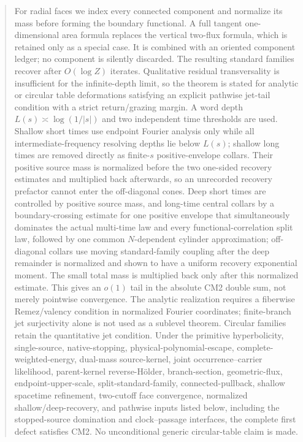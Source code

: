 \documentclass[11pt]{article}
\begin{document}
\begin{abstract}
For radial faces we index every connected component and normalize its mass
before forming the boundary functional.  A full tangent one-dimensional area
formula replaces the vertical two-flux formula, which is retained only as a
special case.  It is combined with an oriented component ledger; no component is silently
discarded.  The resulting standard families recover after $O(\log Z)$
iterates.  Qualitative residual transversality is insufficient for the
infinite-depth limit, so the theorem is stated for analytic or circular table
deformations satisfying an explicit pathwise jet-tail condition with a
strict return/grazing margin.  A word depth $L(s)\asymp\log(1/|s|)$ and two
independent time thresholds are used.  Shallow short times use endpoint
Fourier analysis only while all intermediate-frequency resolving depths lie
below $L(s)$; shallow long times are removed directly as finite-$s$
positive-envelope collars.  Their positive source mass is normalized before
the two one-sided recovery estimates and multiplied back afterwards, so an
unrecorded recovery prefactor cannot enter the off-diagonal cones.
Deep short times are controlled by positive source mass, and long-time
central collars by a boundary-crossing estimate for
one positive envelope that simultaneously dominates the actual multi-time law
and every functional-correlation split law, followed by one common
$N$-dependent cylinder approximation;
off-diagonal collars use moving standard-family coupling after the deep
remainder is normalized and shown to have a uniform recovery exponential
moment.  The small total mass is multiplied back only after this normalized
estimate.  This gives an
$o(1)$ tail in the absolute CM2 double sum, not merely pointwise convergence.
The analytic realization requires a fiberwise Remez/valency condition in
normalized Fourier coordinates; finite-branch jet surjectivity alone is not
used as a sublevel theorem.  Circular families retain the quantitative jet
condition.  Under the primitive hyperbolicity, single-source,
native-stopping, physical-polynomial-escape, complete-weighted-energy,
dual-mass source-kernel, joint occurrence--carrier likelihood,
parent-kernel reverse-H\"older, branch-section,
geometric-flux, endpoint-upper-scale, split-standard-family,
connected-pullback, shallow spacetime refinement, two-cutoff face convergence,
normalized shallow/deep-recovery, and pathwise inputs
listed below, including the stopped-source domination and clock--passage
interfaces, the complete first
defect satisfies CM2.  No unconditional generic circular-table claim is made.

\end{abstract}
\end{document}
